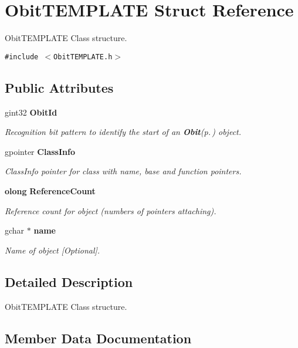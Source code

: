 \section{Obit\-TEMPLATE Struct Reference}
\label{structObitTEMPLATE}
Obit\-TEMPLATE Class structure.  


{\tt \#include $<$Obit\-TEMPLATE.h$>$}

\subsection*{Public Attributes}
\begin{CompactItemize}
\item 
gint32 {\bf Obit\-Id}
\begin{CompactList}\small\item\em Recognition bit pattern to identify the start of an {\bf Obit}{\rm (p.\,\pageref{structObit})} object. \item\end{CompactList}\item 
gpointer {\bf Class\-Info}
\begin{CompactList}\small\item\em Class\-Info pointer for class with name, base and function pointers. \item\end{CompactList}\item 
{\bf olong} {\bf Reference\-Count}
\begin{CompactList}\small\item\em Reference count for object (numbers of pointers attaching). \item\end{CompactList}\item 
gchar $\ast$ {\bf name}
\begin{CompactList}\small\item\em Name of object [Optional]. \item\end{CompactList}\end{CompactItemize}


\subsection{Detailed Description}
Obit\-TEMPLATE Class structure. 



\subsection{Member Data Documentation}
